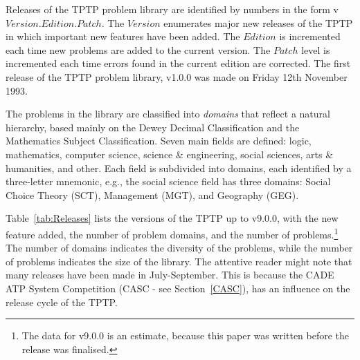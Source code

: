 \documentclass[runningheads]{llncs}
\begin{document}
Releases of the TPTP problem library are identified by numbers in the form 
v$Version$.$Edition$.$Patch$.
The $Version$ enumerates major new releases of the TPTP in which important new features have 
been added.
The $Edition$ is incremented each time new problems are added to the current version.
The $Patch$ level is incremented each time errors found in the current edition are corrected. 
The first release of the TPTP problem library, v1.0.0 was made on Friday 12th November 1993. 

The problems in the library are classified into {\em domains} that reflect a natural hierarchy,
based mainly on the Dewey Decimal Classification and the Mathematics Subject Classification.
Seven main fields are defined: logic, mathematics, computer science, science \& engineering, 
social sciences, arts \& humanities, and other. 
Each field is subdivided into domains, each identified by a three-letter mnemonic, e.g., the
social science field has three domains: Social Choice Theory (SCT), Management (MGT), and
Geography (GEG).

Table~\ref{tab:Releases} lists the versions of the TPTP up to v9.0.0, with the new feature added, 
the number of problem domains, and the number of problems.\footnote{%
The data for v9.0.0 is an estimate, because this paper was written before the release was
finalised.}
The number of domains indicates the diversity of the problems, while the number of problems 
indicates the size of the library.
The attentive reader might note that many releases have been made in July-September.
This is because the CADE ATP System Competition (CASC - see Section~\ref{CASC}), has an 
influence on the release cycle of the TPTP. 
\end{document}
